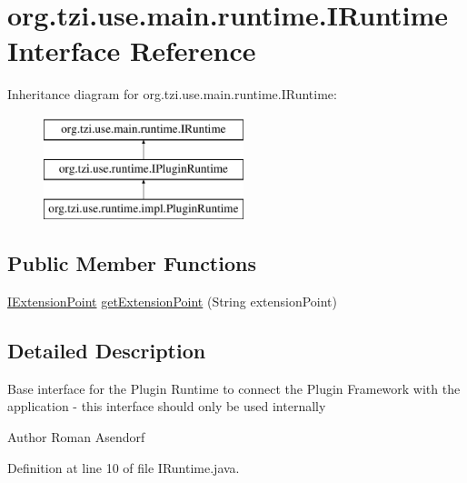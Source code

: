 \hypertarget{interfaceorg_1_1tzi_1_1use_1_1main_1_1runtime_1_1_i_runtime}{\section{org.\-tzi.\-use.\-main.\-runtime.\-I\-Runtime Interface Reference}
\label{interfaceorg_1_1tzi_1_1use_1_1main_1_1runtime_1_1_i_runtime}
}
Inheritance diagram for org.\-tzi.\-use.\-main.\-runtime.\-I\-Runtime\-:\begin{figure}[H]
\begin{center}
\leavevmode
\includegraphics[height=3.000000cm]{interfaceorg_1_1tzi_1_1use_1_1main_1_1runtime_1_1_i_runtime}
\end{center}
\end{figure}
\subsection*{Public Member Functions}
\begin{DoxyCompactItemize}
\item 
\hyperlink{interfaceorg_1_1tzi_1_1use_1_1main_1_1runtime_1_1_i_extension_point}{I\-Extension\-Point} \hyperlink{interfaceorg_1_1tzi_1_1use_1_1main_1_1runtime_1_1_i_runtime_a57a8353c231db23843bb88083d19e16f}{get\-Extension\-Point} (String extension\-Point)
\end{DoxyCompactItemize}


\subsection{Detailed Description}
Base interface for the Plugin Runtime to connect the Plugin Framework with the application -\/ this interface should only be used internally

\begin{DoxyAuthor}{Author}
Roman Asendorf 
\end{DoxyAuthor}


Definition at line 10 of file I\-Runtime.\-java.



